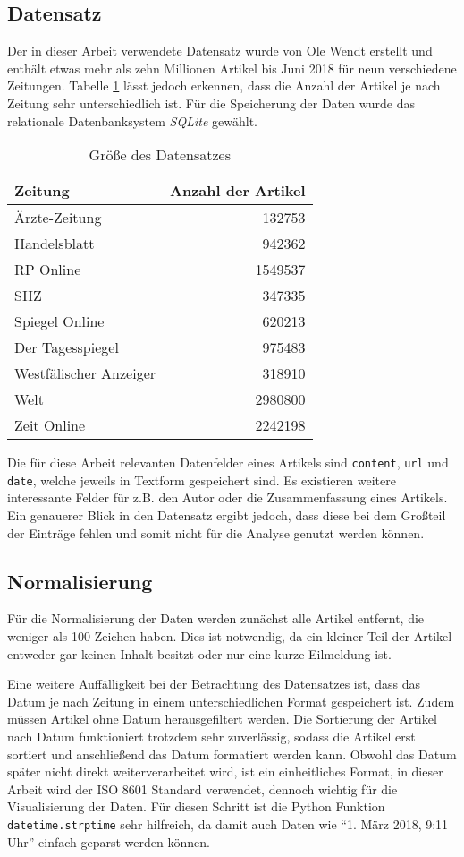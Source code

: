\subsection{Datensatz}
Der in dieser Arbeit verwendete Datensatz wurde von Ole Wendt erstellt und enthält etwas mehr als zehn Millionen Artikel bis Juni 2018 für neun verschiedene Zeitungen. Tabelle \ref{data} lässt jedoch erkennen, dass die Anzahl der Artikel je nach Zeitung sehr unterschiedlich ist. Für die Speicherung der Daten wurde das relationale Datenbanksystem \emph{SQLite} gewählt.

\begin{table}[h]
\centering
\begin{tabular}[t]{lr}
\toprule
Zeitung & Anzahl der Artikel \\
\midrule
Ärzte-Zeitung & 132753 \\
Handelsblatt & 942362 \\
RP Online & 1549537 \\
SHZ & 347335 \\
Spiegel Online & 620213 \\
Der Tagesspiegel & 975483 \\
Westfälischer Anzeiger & 318910 \\
Welt & 2980800 \\
Zeit Online & 2242198 \\
\bottomrule
\end{tabular}
\caption{Größe des Datensatzes}
\label{data}
\end{table}

Die für diese Arbeit relevanten Datenfelder eines Artikels sind \texttt{content}, \texttt{url} und \texttt{date}, welche jeweils in Textform gespeichert sind. Es existieren weitere interessante Felder für z.B. den Autor oder die Zusammenfassung eines Artikels. Ein genauerer Blick in den Datensatz ergibt jedoch, dass diese bei dem Großteil der Einträge fehlen und somit nicht für die Analyse genutzt werden können.

\subsection{Normalisierung}
Für die Normalisierung der Daten werden zunächst alle Artikel entfernt, die weniger als 100 Zeichen haben. Dies ist notwendig, da ein kleiner Teil der Artikel entweder gar keinen Inhalt besitzt oder nur eine kurze Eilmeldung ist.

Eine weitere Auffälligkeit bei der Betrachtung des Datensatzes ist, dass das Datum je nach Zeitung in einem unterschiedlichen Format gespeichert ist. Zudem müssen Artikel ohne Datum herausgefiltert werden. Die Sortierung der Artikel nach Datum funktioniert trotzdem sehr zuverlässig, sodass die Artikel erst sortiert und anschließend das Datum formatiert werden kann. Obwohl das Datum später nicht direkt weiterverarbeitet wird, ist ein einheitliches Format, in dieser Arbeit wird der ISO 8601 Standard verwendet, dennoch wichtig für die Visualisierung der Daten. Für diesen Schritt ist die Python Funktion \texttt{datetime.strptime} sehr hilfreich, da damit auch Daten wie "`1. März 2018, 9:11 Uhr"' einfach geparst werden können.

